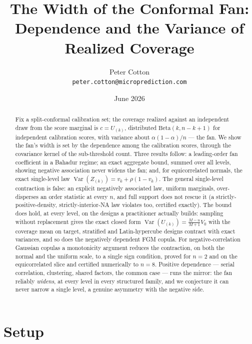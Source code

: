 \documentclass[11pt]{article}
\title{The Width of the Conformal Fan:\\
Dependence and the Variance of Realized Coverage}
\author{Peter Cotton\\\texttt{peter.cotton@microprediction.com}}
\date{June 2026}
\begin{document}
\maketitle

\begin{abstract}
Fix a split-conformal calibration set; the coverage realized against an independent draw from the
score marginal is $c=U_{(k)}$, distributed $\mathrm{Beta}(k,n-k+1)$ for independent calibration
scores, with variance about $\alpha(1-\alpha)/n$ --- the fan. We show the fan's width is set by
the dependence among the calibration scores, through the covariance kernel of the sub-threshold
count. Three results follow: a leading-order fan coefficient in a Bahadur regime; an exact
aggregate bound, summed over all levels, showing negative association never widens the fan; and,
for equicorrelated normals, the exact single-level law
$\operatorname{Var}(Z_{(k)})=v_k+\rho(1-v_k)$. The general single-level contraction is false: an explicit negatively associated law, uniform marginals, over-disperses an order
statistic at every $n$, and full support does not rescue it (a strictly-positive-density,
strictly-interior-NA law violates too, certified exactly). The bound does hold, at every level, on
the designs a practitioner actually builds: sampling without replacement gives the exact closed form
$\operatorname{Var}(U_{(k)})=\tfrac{M-n}{M+1}V_0$ with the coverage mean on target, stratified and
Latin-hypercube designs contract with exact variances, and so does the negatively dependent FGM
copula. For negative-correlation Gaussian copulas a monotonicity argument reduces the contraction, on
both the normal and the uniform scale, to a single sign condition, proved for $n=2$ and on the
equicorrelated slice and certified numerically to $n=8$. Positive dependence --- serial correlation, clustering, shared factors, the common case ---
runs the mirror: the fan reliably \emph{widens}, at every level in every structured family, and we
conjecture it can never narrow a single level, a genuine asymmetry with the negative side.
\end{abstract}

\section{Setup}
\end{document}
